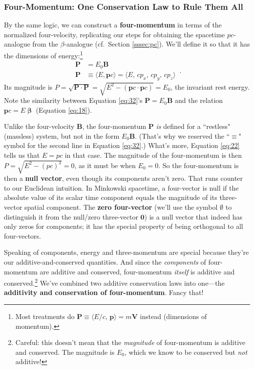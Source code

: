 \documentclass[12pt]{article}
\renewcommand{\vv}[1]{\mathbf{#1}}
\newcommand{\vvbeta}{\bm{\upbeta}}
\begin{document}
\subsubsection{Four-Momentum: One Conservation Law to Rule Them All}

By the same logic, we can construct a \textbf{four-momentum} in terms of the normalized four-velocity, replicating our steps for obtaining the spacetime $p c$-analogue from the $\beta$-analogue (cf.\ Section \ref{sssec:pc}). We'll define it so that it has the dimensions of energy:\footnote{Most treatments do $\vv P \equiv \langle E/c , \, \vv p \rangle = m \vv V$ instead (dimensions of momentum).}
\begin{equation}\label{eq:32}
\boxed{
\begin{aligned}
\vv P &= E_0 \vv B \\
\vv P &\equiv \langle E, \vv p c \rangle = \langle E, \, c p_x, \, c p_y, \, c p_z \rangle
\end{aligned}
} \, .
\end{equation}
Its magnitude is $P = \sqrt{\vv P \cdot \vv P} = \sqrt{E^2 - (\vv p c \cdot \vv p c)} = E_0$, the invariant rest energy. Note the similarity between Equation \ref{eq:32}'s $\vv P = E_0 \vv B$ and the relation $\vv p c = E \vvbeta$ (Equation \ref{eq:18}).

Unlike the four-velocity $\vv B$, the four-momentum $\vv P$ \emph{is} defined for a ``restless" (massless) system, but not in the form $E_0 \vv B$. (That's why we reserved the ``$\equiv$" symbol for the second line in Equation \ref{eq:32}.) What's more, Equation \ref{eq:22} tells us that $E=p c$ in that case. The magnitude of the four-momentum is then $P = \sqrt{E^2 - (p c)^2} = 0$, as it must be when $E_0 = 0$. So the four-momentum is then a \textbf{null vector}, even though its components aren't zero. That runs counter to our Euclidean intuition. In Minkowski spacetime, a four-vector is null if the absolute value of its scalar time component equals the magnitude of its three-vector spatial component. The \textbf{zero four-vector} (we'll use the symbol \mbox{\boldmath$\emptyset$} to distinguish it from the null/zero three-vector $\vv 0$) is a null vector that indeed has only zeros for components; it has the special property of being orthogonal to all four-vectors.

Speaking of components, energy and three-momentum are special because they're our additive-and-conserved quantities. And since the \emph{components} of four-momentum are additive and conserved, four-momentum \emph{itself} is additive and conserved.\footnote{Careful: this doesn't mean that the \emph{magnitude} of four-momentum is additive and conserved. The magnitude is $E_0$, which we know to be conserved but \emph{not} additive!} We've combined two additive conservation laws into one---the \textbf{additivity and conservation of four-momentum}. Fancy that!
\end{document}
